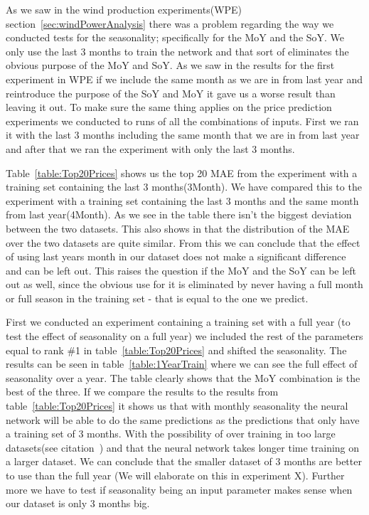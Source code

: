 As we saw in the wind production experiments(WPE) section~\ref{sec:windPowerAnalysis} there was a problem regarding the way we conducted tests for the seasonality; specifically for the MoY and the SoY. We only use the last 3 months to train the network and that sort of eliminates the obvious purpose of the MoY and SoY. As we saw in the results for the first experiment in WPE if we include the same month as we are in from last year and reintroduce the purpose of the SoY and MoY it gave us a worse result than leaving it out. To make sure the same thing applies on the price prediction experiments we conducted to runs of all the combinations of inputs. First we ran it with the last 3 months including the same month that we are in from last year and after that we ran the experiment with only the last 3 months.

Table~\ref{table:Top20Prices} shows us the top 20 MAE from the experiment with a training set containing the last 3 months(3Month). We have compared this to the experiment with a training set containing the last 3 months and the same month from last year(4Month). As we see in the table there isn't the biggest deviation between the two datasets. This also shows in  that the distribution of the MAE over the two datasets are quite similar. From this we can conclude that the effect of using last years month in our dataset does not make a significant difference and can be left out. This raises the question if the MoY and the SoY can be left out as well, since the obvious use for it is eliminated by never having a full month or full season in the training set - that is equal to the one we predict.

First we conducted an experiment containing a training set with a full year (to test the effect of seasonality on a full year) we included the rest of the parameters equal to rank \#1 in table~\ref{table:Top20Prices} and shifted the seasonality. The results can be seen in table~\ref{table:1YearTrain} where we can see the full effect of seasonality over a year. The table clearly shows that the MoY combination is the best of the three. If we compare the results to the results from table~\ref{table:Top20Prices} it shows us that with monthly seasonality the neural network will be able to do the same predictions as the predictions that only have a training set of 3 months. With the possibility of over training in too large datasets(see citation~\cite{1}) and that the neural network takes longer time training on a larger dataset. We can conclude that the smaller dataset of 3 months are better to use than the full year (We will elaborate on this in experiment X). Further more we have to test if seasonality being an input parameter makes sense when our dataset is only 3 months big. 

